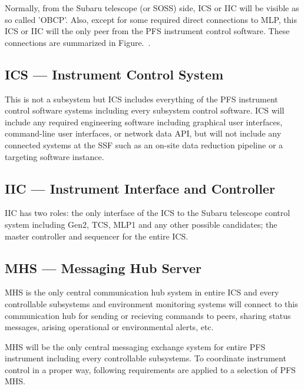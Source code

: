 \documentclass[a4paper,notitlepage]{article}
\begin{document}
Normally, from the Subaru telescope (or SOSS) side, ICS or IIC will be visible 
as so called 'OBCP'. Also, except for some required direct connections to MLP, 
this ICS or IIC will the only peer from the PFS instrument control software. 
These connections are summarized in Figure.~\tbd.


\subsection{ICS --- Instrument Control System}

This is not a subsystem but 
ICS includes everything of the PFS instrument control software systems 
including every subsystem 
control software. ICS will include any required engineering software 
including graphical user interfaces, command-line user interfaces, or 
network data API, but will not include any connected systems at the SSF 
such as an on-site data reduction pipeline or a targeting software 
instance. 


\subsection{IIC --- Instrument Interface and Controller}

IIC has two roles: 
the only interface of the ICS to the Subaru telescope control system 
including Gen2, TCS, MLP1 and any other possible candidates; the master 
controller and sequencer for the entire ICS.

\subsection{MHS --- Messaging Hub Server}

MHS is the only central communication hub 
system in entire ICS and every controllable subsystems and environment 
monitoring systems will connect to this communication hub for sending or 
recieving commands to peers, sharing status messages, arising operational 
or environmental alerts, etc.

MHS will be the only central messaging exchange system for entire PFS 
instrument including every controllable subsystems. 
To coordinate instrument control in a proper way, 
following requirements are applied to a selection of PFS MHS. 
\end{document}
